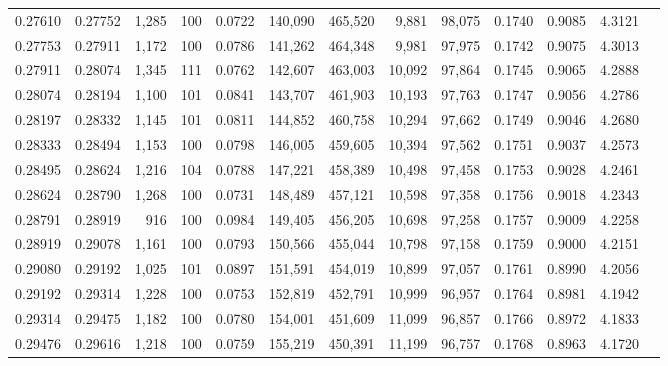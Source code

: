 \begin{tabular}{rrrrrrrrrrrrr}
0.27610 & 0.27752 & 1,285 & 100 &                                     0.0722 & 140,090 & 465,520 &   9,881 &  98,075 & 0.1740 & 0.9085 & 4.3121 \\
0.27753 & 0.27911 & 1,172 & 100 &                                     0.0786 & 141,262 & 464,348 &   9,981 &  97,975 & 0.1742 & 0.9075 & 4.3013 \\
0.27911 & 0.28074 & 1,345 & 111 &                                     0.0762 & 142,607 & 463,003 &  10,092 &  97,864 & 0.1745 & 0.9065 & 4.2888 \\
0.28074 & 0.28194 & 1,100 & 101 &                                     0.0841 & 143,707 & 461,903 &  10,193 &  97,763 & 0.1747 & 0.9056 & 4.2786 \\
0.28197 & 0.28332 & 1,145 & 101 &                                     0.0811 & 144,852 & 460,758 &  10,294 &  97,662 & 0.1749 & 0.9046 & 4.2680 \\
0.28333 & 0.28494 & 1,153 & 100 &                                     0.0798 & 146,005 & 459,605 &  10,394 &  97,562 & 0.1751 & 0.9037 & 4.2573 \\
0.28495 & 0.28624 & 1,216 & 104 &                                     0.0788 & 147,221 & 458,389 &  10,498 &  97,458 & 0.1753 & 0.9028 & 4.2461 \\
0.28624 & 0.28790 & 1,268 & 100 &                                     0.0731 & 148,489 & 457,121 &  10,598 &  97,358 & 0.1756 & 0.9018 & 4.2343 \\
0.28791 & 0.28919 &   916 & 100 &                                     0.0984 & 149,405 & 456,205 &  10,698 &  97,258 & 0.1757 & 0.9009 & 4.2258 \\
0.28919 & 0.29078 & 1,161 & 100 &                                     0.0793 & 150,566 & 455,044 &  10,798 &  97,158 & 0.1759 & 0.9000 & 4.2151 \\
0.29080 & 0.29192 & 1,025 & 101 &                                     0.0897 & 151,591 & 454,019 &  10,899 &  97,057 & 0.1761 & 0.8990 & 4.2056 \\
0.29192 & 0.29314 & 1,228 & 100 &                                     0.0753 & 152,819 & 452,791 &  10,999 &  96,957 & 0.1764 & 0.8981 & 4.1942 \\
0.29314 & 0.29475 & 1,182 & 100 &                                     0.0780 & 154,001 & 451,609 &  11,099 &  96,857 & 0.1766 & 0.8972 & 4.1833 \\
0.29476 & 0.29616 & 1,218 & 100 &                                     0.0759 & 155,219 & 450,391 &  11,199 &  96,757 & 0.1768 & 0.8963 & 4.1720 \\

\end{tabular}
